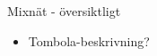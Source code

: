 \begin{frame}{Mixnät - översiktligt}

\begin{itemize}
\item Tombola-beskrivning?
\end{itemize}

\end{frame}
